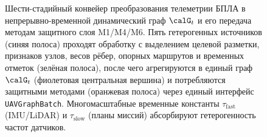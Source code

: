 \begin{figure}[htbp]
\caption{Шести-стадийный конвейер преобразования телеметрии БПЛА в
непрерывно-временной динамический граф $\calG_t$ и его передача
методам защитного слоя \textsf{M1}/\textsf{M4}/\textsf{M6}. Пять
гетерогенных источников (синяя полоса) проходят обработку с
выделением целевой разметки, признаков узлов, весов рёбер, опорных
маршрутов и временных отметок (зелёная полоса), после чего
агрегируются в единый граф $\calG_t$ (фиолетовая центральная
вершина) и потребляются защитными методами (оранжевая полоса)
через единый интерфейс \texttt{UAVGraphBatch}.
Многомасштабные временные константы $\tau_{\mathrm{fast}}$
(IMU/LiDAR) и $\tau_{\mathrm{slow}}$ (планы миссий) абсорбируют
гетерогенность частот датчиков.}
\label{fig:uav_telemetry_pipeline}
\end{figure}
